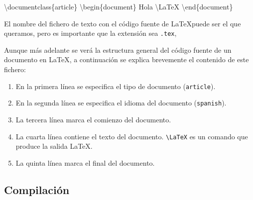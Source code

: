 \documentclass[
  letterpaper,
  DIV=11,
  numbers=noendperiod]{scrreport}
\newenvironment{Shaded}{\begin{snugshade}}{\end{snugshade}}
\newcommand{\BuiltInTok}[1]{\textcolor[rgb]{0.00,0.23,0.31}{#1}}
\newcommand{\ExtensionTok}[1]{\textcolor[rgb]{0.00,0.23,0.31}{#1}}
\newcommand{\FunctionTok}[1]{\textcolor[rgb]{0.28,0.35,0.67}{#1}}
\newcommand{\KeywordTok}[1]{\textcolor[rgb]{0.00,0.23,0.31}{#1}}
\newcommand{\NormalTok}[1]{\textcolor[rgb]{0.00,0.23,0.31}{#1}}
\providecommand{\tightlist}{%
  \setlength{\itemsep}{0pt}\setlength{\parskip}{0pt}}\usepackage{longtable,booktabs,array}
\begin{document}
\begin{Shaded}
\begin{Highlighting}[]
\BuiltInTok{\textbackslash{}documentclass}\NormalTok{\{}\ExtensionTok{article}\NormalTok{\}}
\KeywordTok{\textbackslash{}begin}\NormalTok{\{}\ExtensionTok{document}\NormalTok{\}}
\NormalTok{Hola }\FunctionTok{\textbackslash{}LaTeX}
\KeywordTok{\textbackslash{}end}\NormalTok{\{}\ExtensionTok{document}\NormalTok{\}}
\end{Highlighting}
\end{Shaded}

\begin{tcolorbox}[enhanced jigsaw, arc=.35mm, toprule=.15mm, opacitybacktitle=0.6, colback=white, coltitle=black, colbacktitle=quarto-callout-important-color!10!white, breakable, colframe=quarto-callout-important-color-frame, left=2mm, opacityback=0, bottomtitle=1mm, toptitle=1mm, titlerule=0mm, title=\textcolor{quarto-callout-important-color}{\faExclamation}\hspace{0.5em}{Importante}, bottomrule=.15mm, leftrule=.75mm, rightrule=.15mm]
El nombre del fichero de texto con el código fuente de \LaTeX puede
ser el que queramos, pero es importante que la extensión sea
\texttt{.tex},
\end{tcolorbox}

Aunque más adelante se verá la estructura general del código fuente de
un documento en \LaTeX, a continuación se explica brevemente el
contenido de este fichero:

\begin{enumerate}
\def\labelenumi{\arabic{enumi}.}
\tightlist
\item
  En la primera línea se especifica el tipo de documento
  (\texttt{article}).
\item
  En la segunda línea se especifica el idioma del documento
  (\texttt{spanish}).
\item
  La tercera línea marca el comienzo del documento.
\item
  La cuarta línea contiene el texto del documento.
  \texttt{\textbackslash{}LaTeX} es un comando que produce la salida
  \LaTeX.
\item
  La quinta línea marca el final del documento.
\end{enumerate}

\hypertarget{compilaciuxf3n}{%
\subsection{Compilación}\label{compilaciuxf3n}}
\end{document}

